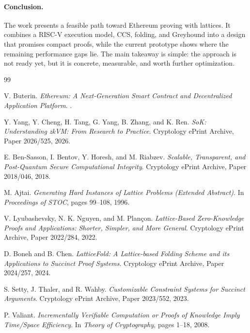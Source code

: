 \documentclass[10pt,a4paper]{article}
\begin{document}
\paragraph{Conclusion.} The work presents a feasible path toward Ethereum
proving with lattices. It combines a RISC-V execution model, CCS, folding, and
Greyhound into a design that promises compact proofs, while the current
prototype shows where the remaining performance gaps lie. The main takeaway is
simple: the approach is not ready yet, but it is concrete, measurable, and
worth further optimization.

\newpage

\begin{thebibliography}{99}

	V. Buterin.
	\newblock \emph{Ethereum: A Next-Generation Smart Contract and Decentralized Application Platform}.
	.

	Y. Yang, Y. Cheng, H. Tang, G. Yang, B. Zhang, and K. Ren.
	\newblock \emph{SoK: Understanding zkVM: From Research to Practice}.
	\newblock Cryptology ePrint Archive, Paper 2026/525, 2026.

	E. Ben-Sasson, I. Bentov, Y. Horesh, and M. Riabzev.
	\newblock \emph{Scalable, Transparent, and Post-Quantum Secure Computational Integrity}.
	\newblock Cryptology ePrint Archive, Paper 2018/046, 2018.

	M. Ajtai.
	\newblock \emph{Generating Hard Instances of Lattice Problems (Extended Abstract)}.
	\newblock In \emph{Proceedings of STOC}, pages 99--108, 1996.

	V. Lyubashevsky, N. K. Nguyen, and M. Plan\c{c}on.
	\newblock \emph{Lattice-Based Zero-Knowledge Proofs and Applications: Shorter, Simpler, and More General}.
	\newblock Cryptology ePrint Archive, Paper 2022/284, 2022.

	D. Boneh and B. Chen.
	\newblock \emph{LatticeFold: A Lattice-based Folding Scheme and its Applications to Succinct Proof Systems}.
	\newblock Cryptology ePrint Archive, Paper 2024/257, 2024.

	S. Setty, J. Thaler, and R. Wahby.
	\newblock \emph{Customizable Constraint Systems for Succinct Arguments}.
	\newblock Cryptology ePrint Archive, Paper 2023/552, 2023.

	P. Valiant.
	\newblock \emph{Incrementally Verifiable Computation or Proofs of Knowledge Imply Time/Space Efficiency}.
	\newblock In \emph{Theory of Cryptography}, pages 1--18, 2008.


\end{thebibliography}
\end{document}
